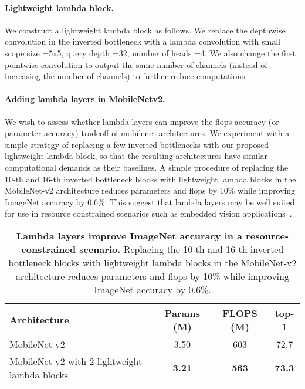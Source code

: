 \documentclass{article} \usepackage{iclr2021_conference,times}
\begin{document}
\paragraph{Lightweight lambda block.}
We construct a lightweight lambda block as follows.
We replace the depthwise convolution in the inverted bottleneck with a lambda convolution with small scope size =5x5, query depth =32, number of heads =4.
We also change the first pointwise convolution to output the same number of channels (instead of increasing the number of channels) to further reduce computations.

\paragraph{Adding lambda layers in MobileNetv2.}
We wish to assess whether lambda layers can improve the flops-accuracy (or parameter-accuracy) tradeoff of mobilenet architectures.
We experiment with a simple strategy of replacing a few inverted bottlenecks with our proposed lightweight lambda block, so that the resulting architectures have similar computational demands as their baselines.
A simple procedure of replacing the 10-th and 16-th inverted bottleneck blocks with lightweight lambda blocks in the MobileNet-v2 architecture reduces parameters and flops by 10\% while improving ImageNet accuracy by 0.6\%.
This suggest that lambda layers may be well suited for use in resource constrained scenarios such as embedded vision applications~\citep{howard2017mobilenets,sandler2018mobilenetv2,howard2019searching}.

\begin{table}[h!]
  \begin{center}
  \small
  \begin{tabular}{lccc}
    \toprule
    Architecture & Params (M) & FLOPS (M) & top-1 \\
    \midrule
    MobileNet-v2 & 3.50 & 603 & 72.7 \\
    MobileNet-v2 with 2 lightweight lambda blocks & \textbf{3.21} & \textbf{563} & \textbf{73.3} \\
    \bottomrule
  \end{tabular}
  \caption{
  \textbf{Lambda layers improve ImageNet accuracy in a resource-constrained scenario.}
  Replacing the 10-th and 16-th inverted bottleneck blocks with lightweight lambda blocks in the MobileNet-v2 architecture reduces parameters and flops by 10\% while improving ImageNet accuracy by 0.6\%.
  }
  \label{tab:mobilenets}
  \end{center}
\end{table} \newpage
\end{document}
